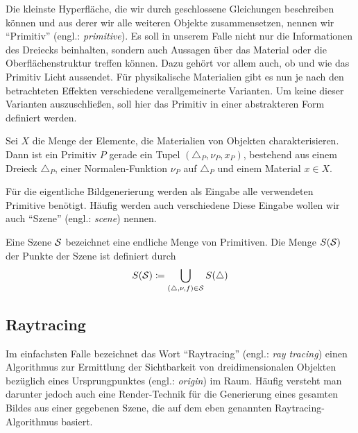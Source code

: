 		Die kleinste Hyperfläche, die wir durch geschlossene Gleichungen beschreiben können und aus derer wir alle weiteren Objekte zusammensetzen, nennen wir \enquote{Primitiv} (engl.: \textit{primitive}).
		Es soll in unserem Falle nicht nur die Informationen des Dreiecks beinhalten, sondern auch Aussagen über das Material oder die Oberflächenstruktur treffen können.
		Dazu gehört vor allem auch, ob und wie das Primitiv Licht aussendet.
		Für physikalische Materialien gibt es nun je nach den betrachteten Effekten verschiedene verallgemeinerte Varianten.
		Um keine dieser Varianten auszuschließen, soll hier das Primitiv in einer abstrakteren Form definiert werden.
		\begin{definition}[Primitiv]
			Sei $X$ die Menge der Elemente, die Materialien von Objekten charakterisieren.
			Dann ist ein Primitiv $P$ gerade ein Tupel $(\triangle_P, \nu_P, x_P)$, bestehend aus einem Dreieck $\triangle_P$, einer Normalen-Funktion $\nu_P$ auf $\triangle_P$ und einem Material $x\in X$.
		\end{definition}

		Für die eigentliche Bildgenerierung werden als Eingabe alle verwendeten Primitive benötigt.
		Häufig werden auch verschiedene
		Diese Eingabe wollen wir auch \enquote{Szene} (engl.: \textit{scene}) nennen.
		\begin{definition}[Szene]
			Eine Szene $\mathcal{S}$ bezeichnet eine endliche Menge von Primitiven.
			Die Menge $S(\mathcal{S})$ der Punkte der Szene ist definiert durch
			\[
				S(\mathcal{S}) \coloneqq \bigcup_{(\triangle,\nu,f)\in\mathcal{S}} S(\triangle)
			\]
		\end{definition}


	\subsection{Raytracing} %
	\label{sub:raytracing}

		Im einfachsten Falle bezeichnet das Wort \enquote{Raytracing} (engl.: \textit{ray tracing}) einen Algorithmus zur Ermittlung der Sichtbarkeit von dreidimensionalen Objekten bezüglich eines Ursprungpunktes (engl.: \textit{origin}) im Raum.
		Häufig versteht man darunter jedoch auch eine Render-Technik für die Generierung eines gesamten Bildes aus einer gegebenen Szene, die auf dem eben genannten Raytracing-Algorithmus basiert.

